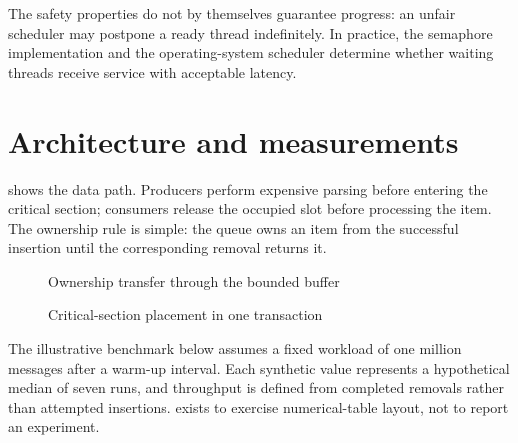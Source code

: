 \documentclass[english]{../../unipd-notes}
\begin{document}
The safety properties do not by themselves guarantee progress: an unfair scheduler may postpone a ready thread indefinitely. In practice, the semaphore implementation and the operating-system scheduler determine whether waiting threads receive service with acceptable latency.

\chapter{Architecture and measurements}

 shows the data path. Producers perform expensive parsing before entering the critical section; consumers release the occupied slot before processing the item. The ownership rule is simple: the queue owns an item from the successful insertion until the corresponding removal returns it.

\begin{figure}[H]
  \centering
  \caption{Ownership transfer through the bounded buffer}\label{fig:architecture}
\end{figure}

\begin{figure}[H]
  \centering
  \caption{Critical-section placement in one transaction}\label{fig:timeline}
\end{figure}

The illustrative benchmark below assumes a fixed workload of one million messages after a warm-up interval. Each synthetic value represents a hypothetical median of seven runs, and throughput is defined from completed removals rather than attempted insertions.  exists to exercise numerical-table layout, not to report an experiment.
\end{document}

